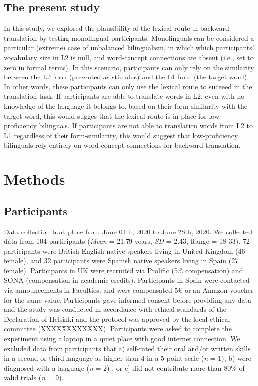 \documentclass[
  english,
  man,floatsintext]{apa6}
\begin{document}
\hypertarget{the-present-study}{%
\subsection{The present study}\label{the-present-study}}

In this study, we explored the plausibility of the lexical route in backward translation by testing monolingual participants. Monolinguals can be considered a particular (extreme) case of unbalanced bilingualism, in which which participants' vocabulary size in L2 is null, and word-concept connections are absent (i.e., set to zero in formal terms). In this scenario, participants can only rely on the similarity between the L2 form (presented as stimulus) and the L1 form (the target word). In other words, these participants can only use the lexical route to suceeed in the translation task. If participants are able to translate words in L2, even with no knowledge of the language it belongs to, based on their form-similarity with the target word, this would sugges that the lexical route is in place for low-proficiency bilinguals. If participants are not able to translation words from L2 to L1 regardless of their form-similarity, this would suggest that low-proficiency bilinguals rely entirely on word-concept connections for backward translation.

\hypertarget{methods}{%
\section{Methods}\label{methods}}

\hypertarget{participants}{%
\subsection{Participants}\label{participants}}

Data collection took place from June 04th, 2020 to June 28th, 2020. We collected data from 104 participants (\emph{Mean} = 21.79 years, \emph{SD} = 2.43, Range = 18-33). 72 participants were British English native speakers living in United Kingdom (46 female), and 32 participants were Spanish native speakers living in Spain (27 female). Participants in UK were recruited via Prolific (5£ compensation) and SONA (compensation in academic credits). Participants in Spain were contacted via announcements in Faculties, and were compensated 5€ or an Amazon voucher for the same value. Participants gave informed consent before providing any data and the study was conducted in accordance with ethical standards of the Declaration of Helsinki and the protocol was approved by the local ethical committee (XXXXXXXXXXXX). Participants were asked to complete the experiment using a laptop in a quiet place with good internet connection. We excluded data from participants that a) self-rated their oral and/or written skills in a second or third language as higher than 4 in a 5-point scale (\emph{n} = 1), b) were diagnosed with a language (\emph{n} = 2) , or c) did not contribute more than 80\% of valid trials (\emph{n} = 9).
\end{document}

